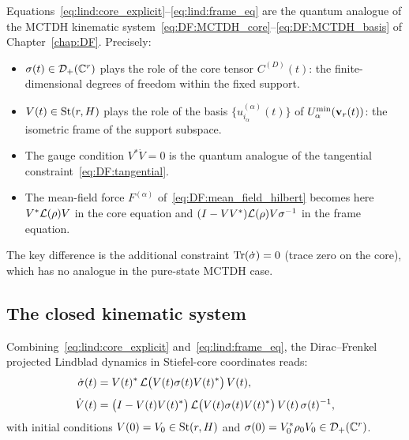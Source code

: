 \begin{remark}
\label{rem:lind:mctdh_special}
Equations~\eqref{eq:lind:core_explicit}--\eqref{eq:lind:frame_eq} are
the quantum analogue of the MCTDH kinematic
system~\eqref{eq:DF:MCTDH_core}--\eqref{eq:DF:MCTDH_basis} of
Chapter~\ref{chap:DF}. Precisely:
\begin{itemize}
\item $\sigma(t) \in \mathcal{D}_+(\mathbb{C}^r)$ plays the role of the core tensor
    $C^{(D)}(t)$: the finite-dimensional degrees of freedom within the
    fixed support.
\item $V(t) \in \mathrm{St}(r,H)$ plays the role of the basis
    $\{u^{(\alpha)}_{i_\alpha}(t)\}$ of $U^{\min}_{\alpha}(\mathbf{v}_r(t))$:
    the isometric frame of the support subspace.
\item The gauge condition $V^*\dot{V} = 0$ is the quantum analogue of
    the tangential constraint~\eqref{eq:DF:tangential}.
\item The mean-field force $F^{(\alpha)}$ of~\eqref{eq:DF:mean_field_hilbert}
    becomes here $V^*\mathcal{L}(\rho)V$ in the core equation and
    $(I-VV^*)\mathcal{L}(\rho)V\sigma^{-1}$ in the frame equation.
\end{itemize}
The key difference is the additional constraint $\mathrm{Tr}(\dot\sigma) = 0$
(trace zero on the core), which has no analogue in the pure-state
MCTDH case.
\end{remark}

\subsection*{The closed kinematic system}

Combining~\eqref{eq:lind:core_explicit} and~\eqref{eq:lind:frame_eq},
the Dirac--Frenkel projected Lindblad dynamics in Stiefel-core
coordinates reads:
\begin{subequations}
\label{eq:lind:kinematic}
\begin{align}
    \dot\sigma(t)
    &= V(t)^*\, \mathcal{L}\bigl(V(t)\sigma(t)V(t)^*\bigr)\, V(t),
    \label{eq:lind:kinematic_core}\\[4pt]
    \dot{V}(t)
    &= \bigl(I - V(t)V(t)^*\bigr)\,
    \mathcal{L}\bigl(V(t)\sigma(t)V(t)^*\bigr)\,
    V(t)\, \sigma(t)^{-1},
    \label{eq:lind:kinematic_frame}
\end{align}
\end{subequations}
with initial conditions $V(0) = V_0 \in \mathrm{St}(r,H)$ and
$\sigma(0) = V_0^* \rho_0 V_0 \in \mathcal{D}_+(\mathbb{C}^r)$.

